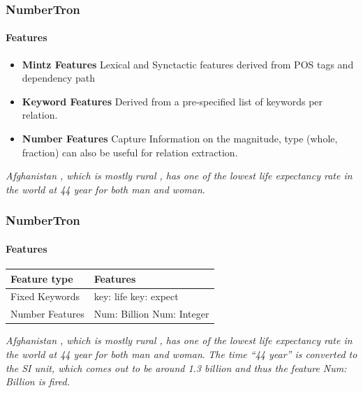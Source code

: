 \documentclass{beamer}
\begin{document}
\begin{frame}
\frametitle{NumberTron}
\framesubtitle{Features}
\begin{itemize}
\setlength \itemsep{2em}
\item \textbf{Mintz Features} Lexical and Synctactic features derived from POS tags and dependency path \cite{mintz}
\item \textbf{Keyword Features}
Derived from a pre-specified list of keywords per relation.
\item \textbf{Number Features} Capture Information on the magnitude, type (whole, fraction) can also be useful for relation extraction.
\end{itemize}

{\color{red}\emph{Afghanistan , which is mostly rural , has one of the lowest life expectancy rate in the world at 44 year for both man and woman}}. 

\end{frame}

\begin{frame}
\frametitle{NumberTron}
\framesubtitle{Features}
\begin{table}
\begin{tabular}{|l|l|}
\hline
Feature type & Features \\
\hline
Fixed Keywords & key: life	key: expect \\
\hline
Number Features & Num: Billion	Num: Integer \\
\hline
\end{tabular} \end{table}
  
{\color{red}\emph{Afghanistan , which is mostly rural , has one of the lowest life expectancy rate in the world at 44 year for both man and woman}}. 
\textit{The time ``44 year'' is converted to the SI unit, which comes out to be around 1.3 billion and thus the feature Num: Billion is fired.}

\end{frame}
\end{document}
